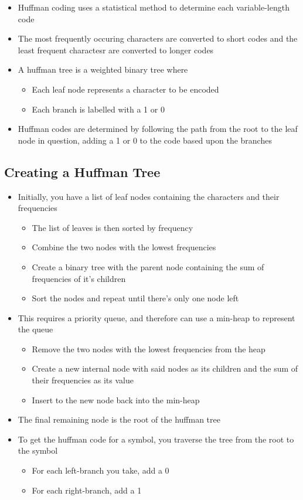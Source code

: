 \begin{itemize}
  \item Huffman coding uses a statistical method to determine each variable-length code
  \item The most frequently occuring characters are converted to short codes and the least frequent charactesr are converted to longer codes
  \item A huffman tree is a weighted binary tree where
  \begin{itemize}
    \item Each leaf node represents a character to be encoded
    \item Each branch is labelled with a 1 or 0
  \end{itemize}
  \item Huffman codes are determined by following the path from the root to the leaf node in question, adding a 1 or 0 to the code based upon the branches
\end{itemize}

\subsection*{Creating a Huffman Tree}

\begin{itemize}
  \item Initially, you have a list of leaf nodes containing the characters and their frequencies
  \begin{itemize}
    \item The list of leaves is then sorted by frequency
    \item Combine the two nodes with the lowest frequencies
    \item Create a binary tree with the parent node containing the sum of frequencies of it's children
    \item Sort the nodes and repeat until there's only one node left
  \end{itemize}
  \item This requires a priority queue, and therefore can use a min-heap to represent the queue
  \begin{itemize}
    \item Remove the two nodes with the lowest frequencies from the heap
    \item Create a new internal node with said nodes as its children and the sum of their frequencies as its value
    \item Insert to the new node back into the min-heap
  \end{itemize}
  \item The final remaining node is the root of the huffman tree
  \item To get the huffman code for a symbol, you traverse the tree from the root to the symbol
  \begin{itemize}
    \item For each left-branch you take, add a 0
    \item For each right-branch, add a 1
  \end{itemize}
\end{itemize}